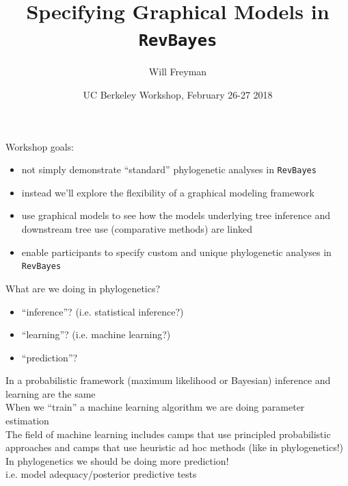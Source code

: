 \documentclass[mathserif]{beamer}
\title{Specifying Graphical Models in \texttt{RevBayes}}
\author{Will Freyman}
\institute{
  Department of Ecology, Evolution \& Behavior \\
  University of Minnesota \\
  \medskip
  \color{Emerald}willfreyman@gmail.com \\
  http://willfreyman.org

}
\date{UC Berkeley Workshop, February 26-27 2018}
\begin{document}
\frame{\titlepage}

\begin{frame}
    \begin{block}{Workshop goals:}
    \begin{itemize}
        \item not simply demonstrate ``standard'' phylogenetic analyses in \texttt{RevBayes}
        \item instead we'll explore the flexibility of a graphical modeling framework 
        \item use graphical models to see how the models underlying tree inference and downstream tree use (comparative methods) are linked
        \item enable participants to specify custom and unique phylogenetic analyses in \texttt{RevBayes}
    \end{itemize}
    \end{block}
\end{frame}


\begin{frame}
    \begin{block}{What are we doing in phylogenetics?}
    \begin{itemize}
        \item ``inference''? (i.e. statistical inference?)
        \item ``learning''? (i.e. machine learning?)
        \item ``prediction''?
    \end{itemize}
    \bigskip
        In a probabilistic framework (maximum likelihood or Bayesian) 
        inference and learning are the same\\
    \bigskip
        When we ``train'' a machine learning algorithm we are doing parameter estimation\\
    \bigskip
        The field of machine learning includes camps that use principled probabilistic approaches and camps that use heuristic ad hoc methods (like in phylogenetics!)\\
    \bigskip
        In phylogenetics we should be doing more \alert{prediction}! \\
    i.e. model adequacy/posterior predictive tests
    \end{block}
\end{frame}
\end{document}
